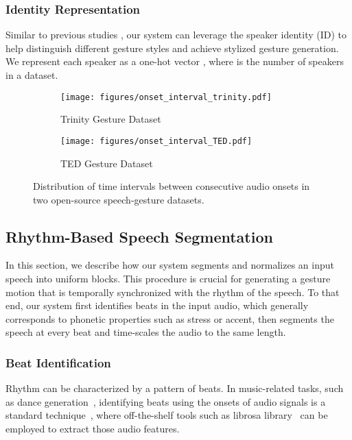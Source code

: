 \documentclass[acmtog,authorversion]{acmart}
\begin{document}
\subsubsection{Identity Representation}
Similar to previous studies \cite{yoon2020speech,bhattacharya2021speech2affectivegestures}, our system can leverage the speaker identity (ID) to help distinguish different gesture styles and achieve stylized gesture generation. We represent each speaker as a one-hot vector , where  is the number of speakers in a dataset.
\begin{figure}[t]
    \centering    
    \begin{subfigure}[t]{0.47\linewidth}
        \centering
        \caption*{Trinity Gesture Dataset}
        \texttt{[image: figures/onset\_interval\_trinity.pdf]}
   \end{subfigure}
   \hspace{\fill}
    \begin{subfigure}[t]{0.47\linewidth}
        \centering
        \caption*{TED Gesture Dataset}
        \texttt{[image: figures/onset\_interval\_TED.pdf]}
   \end{subfigure}
    \caption{Distribution of time intervals between consecutive audio onsets in two open-source speech-gesture datasets.}
    \Description{}
    \label{fig:onset_intervals}
\end{figure}
\subsection{Rhythm-Based Speech Segmentation}
\label{subsec:beat_alignment}
In this section, we describe how our system segments and normalizes an input speech into uniform blocks. This procedure is crucial for generating a gesture motion that is temporally synchronized with the rhythm of the speech. To that end, our system first identifies beats in the input audio, which generally corresponds to phonetic properties such as stress or accent, then segments the speech at every beat and time-scales the audio to the same length.

\subsubsection{Beat Identification}
\label{subsubsec:onset_identification}
Rhythm can be characterized by a pattern of beats. In music-related tasks, such as dance generation~\cite{chen2021choreomaster,aristidou2021rhythm}, identifying beats using the onsets of audio signals is a standard technique~\cite{bello2005onsetTutorial,ellis2007beat}, where off-the-shelf tools such as librosa library~\cite{mcfee2015librosa} can be employed to extract those audio features.
\end{document}
